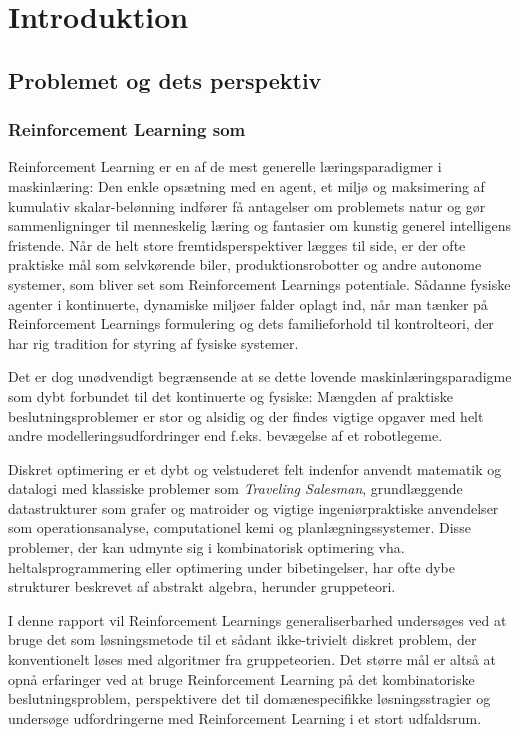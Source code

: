 \documentclass[../main.tex]{subfiles}
\begin{document}
\chapter{Introduktion}
\section{Problemet og dets perspektiv}
\subsection{Reinforcement Learning som }
Reinforcement Learning er en af de mest generelle læringsparadigmer i maskinlæring: 
Den enkle opsætning med en agent, et miljø og maksimering af kumulativ skalar-belønning indfører få antagelser om problemets natur og gør sammenligninger til menneskelig læring og fantasier om kunstig generel intelligens fristende.
Når de helt store fremtidsperspektiver lægges til side, er der ofte praktiske mål som selvkørende biler, produktionsrobotter og andre autonome systemer, som bliver set som Reinforcement Learnings potentiale.
Sådanne fysiske agenter i kontinuerte, dynamiske miljøer falder oplagt ind, når man tænker på Reinforcement Learnings formulering og dets familieforhold til kontrolteori, der har rig tradition for styring af fysiske systemer. 

Det er dog unødvendigt begrænsende at se dette lovende maskinlæringsparadigme som dybt forbundet til det kontinuerte og fysiske: Mængden af praktiske beslutningsproblemer er stor og alsidig og der findes vigtige opgaver med helt andre modelleringsudfordringer end f.eks. bevægelse af et robotlegeme.

Diskret optimering er et dybt og velstuderet felt indenfor anvendt matematik og datalogi med klassiske problemer som \textit{Traveling Salesman}, grundlæggende datastrukturer som grafer og matroider og vigtige ingeniørpraktiske anvendelser som operationsanalyse, computationel kemi og planlægningssystemer. 
Disse problemer, der kan udmynte sig i kombinatorisk optimering vha. heltalsprogrammering eller optimering under bibetingelser, har ofte dybe strukturer beskrevet af abstrakt algebra, herunder gruppeteori.
 
I denne rapport vil Reinforcement Learnings generaliserbarhed undersøges ved at bruge det som løsningsmetode til et sådant ikke-trivielt diskret problem, der konventionelt løses med algoritmer fra gruppeteorien.
Det større mål er altså at opnå erfaringer ved at bruge Reinforcement Learning på det kombinatoriske beslutningsproblem, perspektivere det til domænespecifikke løsningsstragier og undersøge udfordringerne med Reinforcement Learning i et stort udfaldsrum. 
\end{document}
